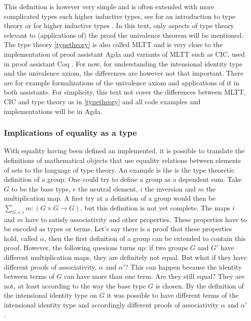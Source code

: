 \documentclass[12pt,a4paper,twoside,xetex]{book} %
\begin{document}
This definition is however very simple and is often extended with more complicated types such higher inductive types, see for an introduction to type theory
\cite{Palmgren2014} or for higher inductive types \cite{Voevodsky2013}. In this text, only aspects of type 
theory relevant to (applications of) the proof the univalence theorem will be 
mentioned. The type theory \cref{typetheory} is also called MLTT and is very close to the implementation of proof assistant Agda \cite{Abel2019} and variants of MLTT such as CIC, used in proof assistant Coq \cite{Arias2019}. For now, for understanding the intensional 
identity type and the univalence axiom, the differences are however not that 
important. There are for example formalizations of the univalence axiom and 
applications of it in both assistants. For simplicity, this text not cover the differences between MLTT,  CIC and type theory as in \cref{typetheory} and all code examples and implementations will be in Agda.

\subsubsection{Implications of equality as a type}\label{groupex}

With equality having been defined an implemented, it is possible to translate 
the definitions of mathematical objects that use equality relations between 
elements of sets to the language of type theory. An example is the is the type 
theoretic definition of a group. One could try to define a group as a dependent 
sum. Take $G$ to be the base type, $e$ the neutral element, $i$ the inversion 
and $m$ the multiplication map. A first try at a definition of a group would 
then be $\sum_{G,e,i}m:(G\times G \rightarrow G)$, but this definition is not 
yet complete. The maps $i$ and $m$  have to satisfy associativity and other 
properties. These properties have to be encoded as types or terms. Let's say there is a proof that these properties hold, called $\alpha$, then the first definition of a group can be extended to contain this proof. However, the following quesions turns up: if two groups $G$ and $G'$ have different multiplication 
maps, they are definitely not equal. But what if they have different proofs of 
associativity, $\alpha$ and $\alpha'$? This can happen because the identity 
between terms of  $G$ can have more than one term. Are they still equal? They 
are not, at least according to the way the base type $G$ is chosen. By the 
definition of the intensional identity type on $G$ it was possible to have 
different terms of the intensional identity type and accordingly different 
proofs of associativity $\alpha$ and $\alpha'$.
\end{document}
